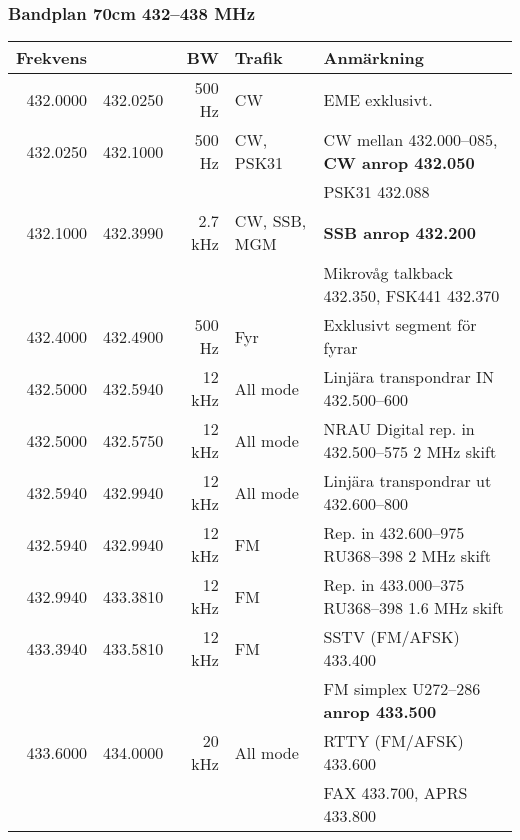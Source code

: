\subsubsection{Bandplan 70cm 432--438 MHz}
\begin{tabular}{rrrll}
	\textbf{Frekvens} &          & \textbf{BW} & \textbf{Trafik} & \textbf{Anmärkning}                               \\ \hline
	
	432.0000 & 432.0250 & 500 Hz  & CW           & EME exklusivt.                                    \\ \hline
	432.0250 & 432.1000 & 500 Hz  & CW, PSK31    & CW mellan 432.000--085, \textbf{CW anrop 432.050} \\
	&          &         &              & PSK31 432.088                                     \\ \hline
	432.1000 & 432.3990 & 2.7 kHz & CW, SSB, MGM & \textbf{SSB anrop 432.200}                        \\
	&          &         &              & Mikrovåg talkback 432.350, FSK441 432.370         \\ \hline
	432.4000 & 432.4900 & 500 Hz  & Fyr          & Exklusivt segment för fyrar                       \\ \hline
	432.5000 & 432.5940 & 12 kHz  & All mode     & Linjära transpondrar IN 432.500--600              \\ \hline
	432.5000 & 432.5750 & 12 kHz  & All mode     & NRAU Digital rep. in 432.500--575 2 MHz skift     \\ \hline
	432.5940 & 432.9940 & 12 kHz  & All mode     & Linjära transpondrar ut 432.600--800              \\ \hline
	432.5940 & 432.9940 & 12 kHz  & FM           & Rep. in 432.600--975 RU368--398 2 MHz skift       \\ \hline
	432.9940 & 433.3810 & 12 kHz  & FM           & Rep. in 433.000--375 RU368--398 1.6 MHz skift     \\ \hline
	433.3940 & 433.5810 & 12 kHz  & FM           & SSTV (FM/AFSK) 433.400                            \\
	&          &         &              & FM simplex U272--286 \textbf{anrop 433.500}       \\ \hline
	433.6000 & 434.0000 & 20 kHz  & All mode     & RTTY (FM/AFSK) 433.600                            \\
	&          &         &              & FAX 433.700, APRS 433.800                         \\ \hline

\end{tabular}
